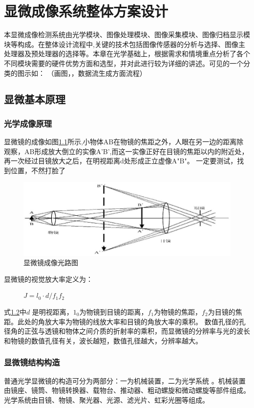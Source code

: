 \chapter{显微成像系统整体方案设计}
本显微成像检测系统由光学模块、图像处理模块、图像采集模块、图像归档显示模块等构成。在整体设计流程中,关键的技术包括图像传感器的分析与选择、图像主处理器及预处理器的选择等。本章在光学基础上，根据需求和情境重点分析了各个不同模块需要的硬件优势方面和选型，并对此进行较为详细的讲述。可见的一个分类的图示如：
（画图，，数据流生成方面流程）

\section{显微基本原理}
\subsection{光学成像原理}

显微镜的成像如图\ref{fig:micro_1}所示,小物体AB在物镜的焦距之外，人眼在另一边的距离除观察，AB形成放大倒立的实像A'B',而这一实像正好在目镜的焦距以内的附近处，再一次经过目镜放大之后，在明视距离d处形成正立虚像A"B"\cite{lightxidian}。
 一定要测试，找到位置，不然打脸了

\begin{figure}[h]
	\centering
	\includegraphics[width=0.7\linewidth]{Figure/micro_1}
	\caption[显微镜成像光路图]{显微镜成像光路图}
	\label{fig:micro_1}
\end{figure}

显微镜的视觉放大率定义为：

\begin{figure}[h]
\centering
\label{j2}
	$J = l_{0}\cdot d / f_{1}f_{2}$
\end{figure}
式\ref{j2}中$d$ 是明视距离，$1_{0}$为物镜到目镜的距离，$f_{1}$为物镜的焦距，$f_{2}$为目镜的焦距。此处的角放大率为物镜的线放大率和目镜的角放大率的乘积。
数值孔径的孔径角的正弦与透镜和物体之间介质的折射率的乘积，而显微镜的分辨率与光的波长和物镜的数值孔径有关，波长越短，数值孔径越大，分辨率越大。\cite{fenbianlv}


\subsection{显微镜结构构造}
普通光学显微镜的构造可分为两部分：一为机械装置，二为光学系统 。机械装置由镜座、镜筒、物镜转换器、载物台、推动器、粗动螺旋和微动螺旋等部件组成。光学系统由目镜、物镜、聚光器、光源、滤光片、虹彩光圈等组成。

